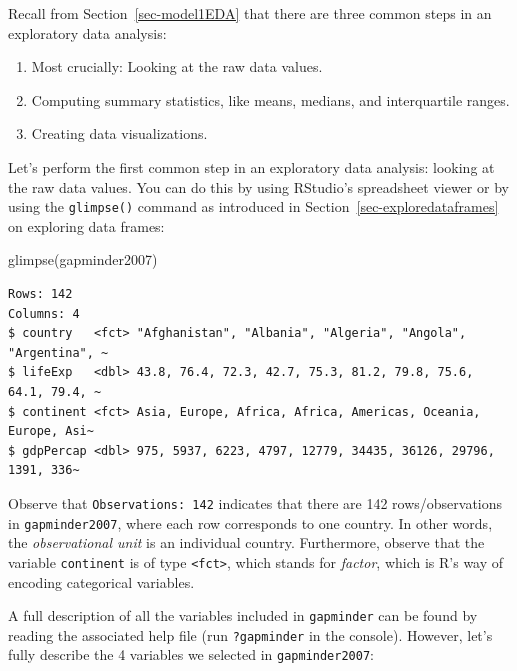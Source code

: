 \documentclass[
  letterpaper,
  DIV=11,
  numbers=noendperiod]{scrreprt}
\newenvironment{Shaded}{\begin{snugshade}}{\end{snugshade}}
\newcommand{\FunctionTok}[1]{\textcolor[rgb]{0.28,0.35,0.67}{#1}}
\newcommand{\NormalTok}[1]{\textcolor[rgb]{0.00,0.23,0.31}{#1}}
\theoremstyle{definition}
\theoremstyle{remark}
\begin{document}
Recall from Section~\ref{sec-model1EDA} that there are three common
steps in an exploratory data analysis:

\begin{enumerate}
\def\labelenumi{\arabic{enumi}.}
\item
  Most crucially: Looking at the raw data values.
\item
  Computing summary statistics, like means, medians, and interquartile
  ranges.
\item
  Creating data visualizations.
\end{enumerate}

Let's perform the first common step in an exploratory data analysis:
looking at the raw data values. You can do this by using RStudio's
spreadsheet viewer or by using the \texttt{glimpse()} command as
introduced in Section~\ref{sec-exploredataframes} on exploring data
frames:

\begin{Shaded}
\begin{Highlighting}[]
\FunctionTok{glimpse}\NormalTok{(gapminder2007)}
\end{Highlighting}
\end{Shaded}

\begin{verbatim}
Rows: 142
Columns: 4
$ country   <fct> "Afghanistan", "Albania", "Algeria", "Angola", "Argentina", ~
$ lifeExp   <dbl> 43.8, 76.4, 72.3, 42.7, 75.3, 81.2, 79.8, 75.6, 64.1, 79.4, ~
$ continent <fct> Asia, Europe, Africa, Africa, Americas, Oceania, Europe, Asi~
$ gdpPercap <dbl> 975, 5937, 6223, 4797, 12779, 34435, 36126, 29796, 1391, 336~
\end{verbatim}

Observe that \texttt{Observations:\ 142} indicates that there are 142
rows/observations in \texttt{gapminder2007}, where each row corresponds
to one country. In other words, the \emph{observational unit} is an
individual country. Furthermore, observe that the variable
\texttt{continent} is of type \texttt{\textless{}fct\textgreater{}},
which stands for \emph{factor}, which is R's way of encoding categorical
variables.

A full description of all the variables included in \texttt{gapminder}
can be found by reading the associated help file (run
\texttt{?gapminder} in the console). However, let's fully describe the 4
variables we selected in \texttt{gapminder2007}:
\end{document}
